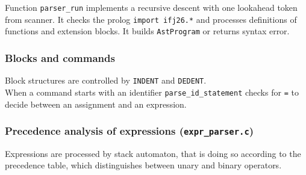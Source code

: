 \documentclass[a4paper]{article}
\begin{document}
Function \texttt{parser\_run} implements a recursive descent with one lookahead token from scanner.
It checks the prolog \texttt{import ifj26.*} and processes definitions of functions and extension blocks.
It builds \texttt{AstProgram} or returns syntax error.

\subsubsection{Blocks and commands}

Block structures are controlled by \texttt{INDENT} and \texttt{DEDENT}.\\
When a command starts with an identifier \texttt{parse\_id\_statement} checks for \texttt{=} to decide between an assignment and an expression.

\subsubsection{Precedence analysis of expressions (\texttt{expr\_parser.c})}

Expressions are processed by stack automaton, that is doing so according to the precedence table, which distinguishes between unary and binary operators.
\end{document}
